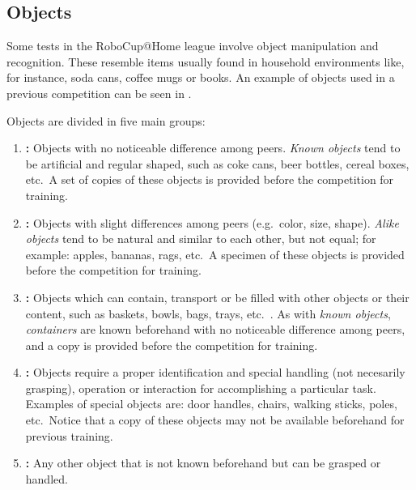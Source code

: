 %
%
%
\def\NumObjects{10\ }
\def\NumLocations{20\ }
\def\NumNames{20\ }

\subsection{Objects}
\label{rule:scenario_objects}
Some tests in the RoboCup@Home league involve object manipulation and recognition. These  resemble items usually found in household environments like, for instance, soda cans, coffee mugs or books. An example of objects used in a previous competition can be seen in .

Objects are divided in five main groups:

\begin{enumerate}
	\item \textbf{:} Objects with no noticeable difference among peers. \textit{Known objects} tend to be artificial and regular shaped, such as coke cans, beer bottles, cereal boxes, etc.~A set of copies of these objects is provided before the competition for training.

	\item \textbf{:} Objects with slight differences among peers (e.g.~color, size, shape). \textit{Alike objects} tend to be natural and similar to each other, but not equal; for example: apples, bananas, rags, etc.~A specimen of these objects is provided before the competition for training.

	\item \textbf{:} Objects which can contain, transport or be filled with other objects or their content, such as baskets, bowls, bags, trays, etc.~. As with \textit{known objects}, \textit{containers} are known beforehand with no noticeable difference among peers, and a copy is provided before the competition for training.

	\item \textbf{:} Objects require a proper identification and special handling (not necesarily grasping), operation or interaction for accomplishing a particular task. Examples of special objects are: door handles, chairs, walking sticks, poles, etc.~Notice that a copy of these objects may not be available beforehand for previous training.

	\item \textbf{:} Any other object that is not known beforehand but can be grasped or handled.
\end{enumerate}

